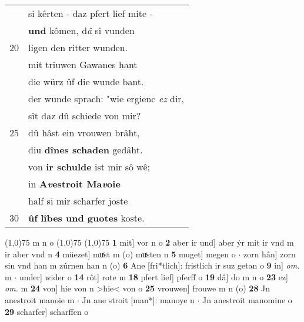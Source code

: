 \documentclass[8pt,a4paper,notitlepage]{article}
\begin{document}
\begin{table}[ht]
\begin{minipage}[t]{0.5\linewidth}
\begin{tabular}{rl}
 & si kêrten - daz pfert lief mite -\\ 
 & \textbf{und} kômen, d\textit{â} si vunden\\ 
20 & ligen den ritter wunden.\\ 
 & mit triuwen Gawanes hant\\ 
 & die würz ûf die wunde bant.\\ 
 & der wunde sprach: "wie ergienc \textit{ez} dir,\\ 
 & sît daz dû schiede von mir?\\ 
25 & dû hâst ein vrouwen brâht,\\ 
 & diu \textbf{dînes schaden} gedâht.\\ 
 & von \textbf{ir schulde} ist mir sô wê;\\ 
 & in \textbf{A\textit{v}estroit Ma\textit{v}oie}\\ 
 & half si mir scharfer joste\\ 
30 & \textbf{ûf} \textbf{lîbes und guotes} koste.\\ 
\end{tabular}
\scriptsize
\line(1,0){75} \newline
m n o \newline
\line(1,0){75} \newline
\newline
\line(1,0){75} \newline
\textbf{1} mit] vor n o \textbf{2} aber ir und] aber ẏr mit ir vnd m ir aber vnd n \textbf{4} müezet] muͯst m (o) muͯsten n \textbf{5} muget] megen o  $\cdot$ zorn hân] zorn sin vnd han m zúrnen han n (o) \textbf{6} Ane [fri*tlich]: fristlich ir suz getan o \textbf{9} in] \textit{om.} m  $\cdot$ under] wider o \textbf{14} rôt] rote m \textbf{18} pfert lief] pferff o \textbf{19} dâ] do m n o \textbf{23} ez] \textit{om.} m \textbf{24} von] hie von n >hie< von o \textbf{25} vrouwen] frouwe m n (o) \textbf{28} Jn anestroit manoie m  $\cdot$ Jn ane stroit [man*]: manoye n  $\cdot$ Jn anestroit manomine o \textbf{29} scharfer] scharffen o \newline
\end{minipage}
\end{table}
\newpage
\end{document}
